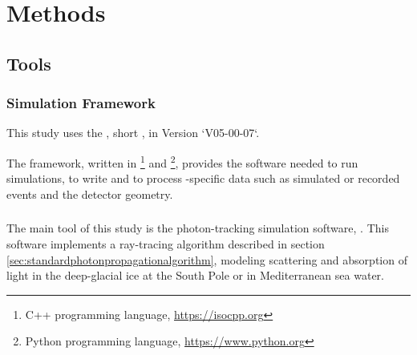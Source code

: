 
\section{Methods}
\label{sec:methods}

\subsection{Tools}

\subsubsection{\icecube Simulation Framework}

This study uses the , short \icesim, in Version `V05-00-07`.

The framework, written in \footnote{C++ programming language, \url{https://isocpp.org}} and \footnote{Python programming language, \url{https://www.python.org}}, provides the software needed to run simulations, to write and to process \icecube-specific data such as simulated or recorded events and the detector geometry.





\subsubsection{\clsim}

The main tool of this study is the photon-tracking simulation software, \clsim. This software implements a ray-tracing algorithm described in section \ref{sec:standardphotonpropagationalgorithm}, modeling scattering and absorption of light in the deep-glacial ice at the South Pole or in Mediterranean sea water. \cite{clsimreadme}


